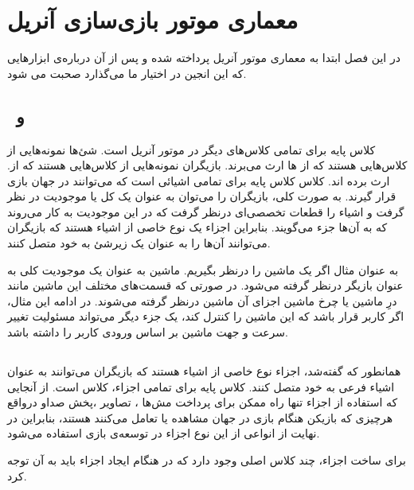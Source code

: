 \chapter {معماری  موتور بازی‌سازی آنریل}
در این فصل ابتدا به معماری موتور آنریل پرداخته شده و پس از آن درباره‌ی ابزار‌هایی که این انجین در اختیار ما می‌گذارد صحبت می شود.

\section { \, و \, }

کلاس پایه برای تمامی کلاس‌های دیگر در موتور آنریل
است.
‌شئ‌ها
‌نمونه‌هایی از کلاس‌هایی هستند که از 
ها ارث می‌برند.
بازیگران
نمونه‌هایی از کلاس‌هایی هستند که از.
ارث برده اند.
کلاس 
کلاس پایه برای تمامی اشیائی است که می‌توانند در جهان بازی قرار گیرند.
به صورت کلی، بازیگران را می‌توان به عنوان یک کل یا موجودیت در نظر گرفت و اشیاء را قطعات تخصصی‌ای درنظر گرفت که در این موجودیت به کار می‌روند
که به آن‌ها جزء 
می‌گویند.
بنابراین اجزاء یک نوع خاصی از اشیاء هستند که بازیگران می‌توانند آن‌ها را به عنوان یک زیر‌شئ
به خود متصل کنند.

به عنوان مثال اگر یک ماشین را درنظر بگیریم. ماشین به عنوان یک موجودیت کلی به عنوان بازیگر درنظر گرفته می‌شود. در صورتی که قسمت‌های مختلف این ماشین مانند درِ ماشین یا چرخ ماشین اجزای آن ماشین درنظر گرفته می‌شوند. در ادامه این مثال، اگر کاربر قرار باشد که این ماشین را کنترل کند، یک جزء دیگر می‌تواند مسئولیت تغییر سرعت و جهت ماشین بر اساس ورودی کاربر را داشته باشد.
\cite{UnrealEngineArchitecture, UnrealEngineComponents}

\section{}
همانطور که گفته‌شد، اجزاء نوع خاصی از اشیاء هستند که بازیگران می‌توانند به عنوان اشیاء فرعی به خود متصل کنند.
کلاس پایه برای تمامی اجزاء، کلاس
است. از آنجایی که استفاده از اجزاء تنها راه ممکن برای پرداخت
مش‌ها
، تصاویر
،پخش صداو درواقع هرچیزی که بازیکن هنگام بازی در جهان مشاهده یا تعامل می‌کنند هستند، بنابراین در نهایت از انواعی از این نوع اجزاء در توسعه‌ی بازی استفاده می‌شود.

برای ساخت اجزاء، چند کلاس اصلی وجود دارد که در هنگام ایجاد اجزاء باید به آن توجه کرد.

